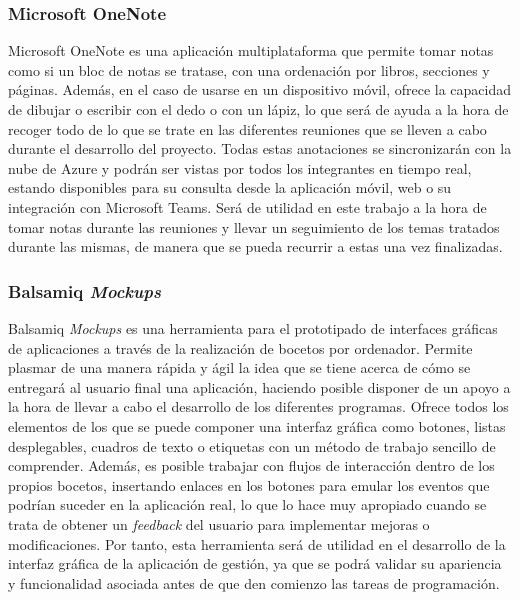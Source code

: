 \newpage

\subsubsection{Microsoft OneNote}
Microsoft OneNote \cite{onenote} es una aplicación multiplataforma que permite tomar notas como si un bloc de notas se tratase, con una ordenación por libros, secciones y páginas. Además, en el caso de usarse en un dispositivo móvil, ofrece la capacidad de dibujar o escribir con el dedo o con un lápiz, lo que será de ayuda a la hora de recoger todo de lo que se trate en las diferentes reuniones que se lleven a cabo durante el desarrollo del proyecto. Todas estas anotaciones se sincronizarán con la nube de Azure y podrán ser vistas por todos los integrantes en tiempo real, estando disponibles para su consulta desde la aplicación móvil, web o su integración con Microsoft Teams. Será de utilidad en este trabajo a la hora de tomar notas durante las reuniones y llevar un seguimiento de los temas tratados durante las mismas, de manera que se pueda recurrir a estas una vez finalizadas.

\subsubsection{Balsamiq \textit{Mockups}}
Balsamiq \textit{Mockups} \cite{balsamiq} es una herramienta para el prototipado de interfaces gráficas de aplicaciones a través de la realización de bocetos por ordenador. Permite plasmar de una manera rápida y ágil la idea que se tiene acerca de cómo se entregará al usuario final una aplicación, haciendo posible disponer de un apoyo a la hora de llevar a cabo el desarrollo de los diferentes programas. Ofrece todos los elementos de los que se puede componer una interfaz gráfica como botones, listas desplegables, cuadros de texto o etiquetas con un método de trabajo sencillo de comprender. Además, es posible trabajar con flujos de interacción dentro de los propios bocetos, insertando enlaces en los botones para emular los eventos que podrían suceder en la aplicación real, lo que lo hace muy apropiado cuando se trata de obtener un \textit{feedback} del usuario para implementar mejoras o modificaciones. Por tanto, esta herramienta será de utilidad en el desarrollo de la interfaz gráfica de la aplicación de gestión, ya que se podrá validar su apariencia y funcionalidad asociada antes de que den comienzo las tareas de programación.

